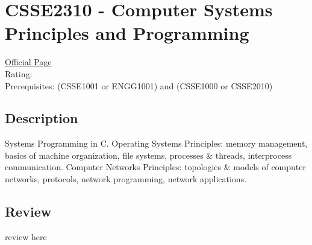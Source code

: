 \hypertarget{CSSE2310}{\section{CSSE2310 - Computer Systems Principles and Programming}}

\large
\textcolor{turbo_purple}{\href{https://my.uq.edu.au/programs-courses/course.html?course_code=CSSE2310}{Official Page}} \\
Rating: \cstar\cstar\cstar\cstar\ostar \\
Prerequisites: (CSSE1001 or ENGG1001) and (CSSE1000 or CSSE2010)

\normalsize
\subsection*{Description}
Systems Programming in C.
Operating Systems Principles: memory management, basics of machine organization, file systems, processes \& threads, interprocess communication.
Computer Networks Principles: topologies \& models of computer networks, protocols, network programming, network applications.

\subsection*{Review}
review here
